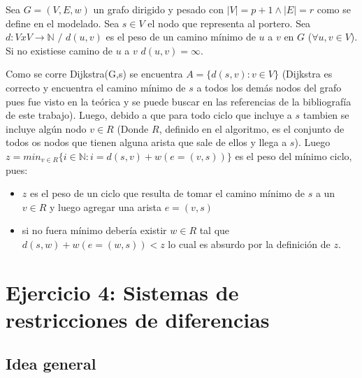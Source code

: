 \documentclass[a4paper]{article}
\begin{document}
Sea $G =(V,E,w)$ un grafo dirigido y pesado con $|V| = p + 1 \land |E| = r $ como se define en el modelado. Sea $s \in V$ el nodo que representa al portero. Sea $d : V x V \longrightarrow \mathbb{N} $  $/$ $d(u,v) $ es el peso de un camino mínimo de $u$ a $v$ en $G$ ($\forall u,v \in V$). Si no existiese camino de $u$ a $v$ $d(u,v) = \infty$.

Como se corre Dijkstra(G,s) se encuentra $A = \{ d(s,v) : v \in V \} $ (Dijkstra es correcto y encuentra el camino mínimo de $s$ a todos los demás nodos del grafo pues fue visto en la teórica y se puede buscar en las referencias de la bibliografía de este trabajo). Luego, debido a que para todo ciclo que incluye a $s$ tambien se incluye algún nodo $v \in R$ (Donde $R$, definido en el algoritmo, es el conjunto de todos os nodos que tienen alguna arista que sale de ellos y llega a $s$). Luego $ z = min_{v \in R} \{i \in \mathbb{N} : i = d(s,v) + w( e = (v,s) )\}$ es el peso del mínimo ciclo, pues:

\begin{itemize}
    \item $z$ es el peso de un ciclo que resulta de tomar el camino mínimo de $s$ a un $v \in R$ y luego agregar una arista $e=(v,s)$
    \item si no fuera mínimo debería existir $w \in R$ tal que $d(s,w) + w( e = (w,s) )  < z $ lo cual es absurdo por la definición de $z$.
\end{itemize}
 




\section{Ejercicio 4: Sistemas de restricciones de diferencias}


\subsection{Idea general}
\end{document}
